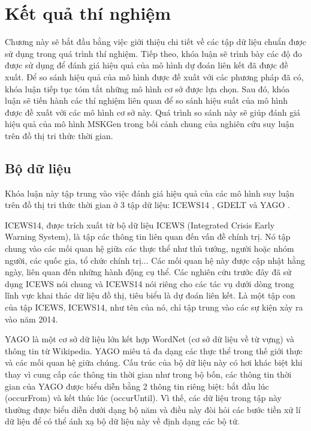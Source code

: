 \chapter{Kết quả thí nghiệm}
\label{Chapter5}
Chương này sẽ bắt đầu bằng việc giới thiệu chi tiết về các tập dữ liệu
chuẩn được sử dụng trong quá trình thí nghiệm. Tiếp theo, khóa luận sẽ
trình bày các độ đo được sử dụng để đánh giá hiệu quả của mô hình dự
đoán liên kết đã được đề xuất. Để so sánh hiệu quả của mô hình được
đề xuất với các phương pháp đã có, khóa luận tiếp tục tóm tắt những mô
hình cơ sở được lựa chọn. Sau đó, khóa luận sẽ tiến hành các thí nghiệm liên quan để so sánh hiệu suất của mô hình được đề xuất với các mô hình cơ sở này. Quá trình so sánh này sẽ giúp đánh giá hiệu quả của mô hình MSKGen trong bối cảnh chung của nghiên cứu suy luận trên đồ thị tri thức thời gian.

\section{Bộ dữ liệu}
Khóa luận này tập trung vào việc đánh giá hiệu quả của các mô hình suy luận trên đồ thị tri thức thời gian ở 3 tập dữ liệu: ICEWS14 \cite{ref_article19}, GDELT \cite{ref_article20} và YAGO \cite{ref_article21}. 

ICEWS14, được trích xuất từ bộ dữ liệu ICEWS (Integrated Crisis Early Warning System), là tập các thông tin liên quan đến vấn đề chính trị. Nó tập chung vào các mối quan hệ giữa các thực thể như thủ tướng, người hoặc nhóm người, các quốc gia, tổ chức chính trị... Các mối quan hệ này được cập nhật hằng ngày, liên quan đến những hành động cụ thể. Các nghiên cứu trước đây đã sử dụng ICEWS nói chung và ICEWS14 nói riêng cho các tác vụ dưới dòng trong lĩnh vực khai thác dữ liệu đồ thị, tiêu biểu là dự đoán liên kết. Là một tập con của tập ICEWS, ICEWS14, như tên của nó, chỉ tập trung vào các sự kiện xảy ra vào năm 2014.

YAGO là một cơ sở dữ liệu lớn kết hợp WordNet (cơ sở dữ liệu về từ vựng) và thông tin từ Wikipedia. YAGO miêu tả đa dạng các thực thể
trong thế giới thực và các mối quan hệ giữa chúng. Cấu trúc của bộ dữ liệu này có hơi khác biệt khi thay vì cung cấp các thông tin thời gian như trong bộ bốn, các thông tin thời gian của YAGO được biểu diễn bằng 2 thông tin riêng biệt: bắt đầu lúc (occurFrom) và kết thúc lúc (occurUntil). Vì thế, các dữ liệu trong tập này thường được biểu diễn dưới dạng bộ năm và điều này đòi hỏi các bước tiền xử lí dữ liệu để có thể ánh xạ bộ dữ liệu này về định dạng các bộ tứ.

